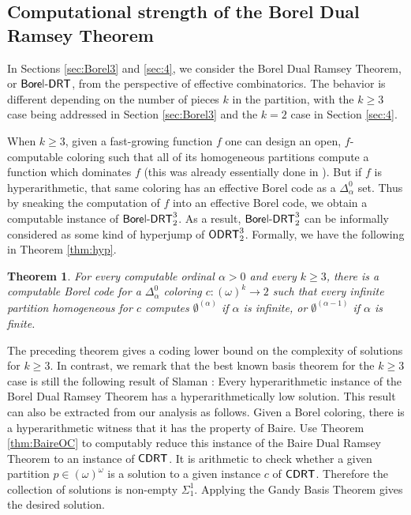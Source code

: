 \documentclass{amsart}
\newtheorem{thm}{Theorem}[section]
\theoremstyle{definition}
\theoremstyle{remark}
\newcommand{\system}[1]{\mbox{\fontfamily{cmss}\fontshape{n}\fontseries{m}%
    \selectfont#1}}
\newcommand{\BoDRT}{\system{Borel-DRT}}
\newcommand{\CDRT}{\system{CDRT}}
\newcommand{\ODRT}{\system{ODRT}}
\begin{document}
\subsection{Computational strength of the Borel Dual Ramsey Theorem}

In Sections \ref{sec:Borel3} and \ref{sec:4}, we consider the Borel Dual 
Ramsey Theorem, or $\BoDRT$, from the perspective of effective 
combinatorics.  The behavior is different depending on the number of 
pieces $k$ in the partition, with the $k\geq 3$ case being addressed in Section 
\ref{sec:Borel3} and the $k=2$ case in Section \ref{sec:4}.

When $k\geq 3$, given a fast-growing function $f$ one can design 
an open, $f$-computable 
coloring such that all of its homogeneous partitions compute 
a function which dominates $f$ (this was already essentially done 
in \cite{ms}).  But if $f$ is hyperarithmetic,
that same coloring has an effective Borel code as a $\Delta^0_\alpha$
set.  Thus by sneaking the computation of $f$ into an 
effective Borel code, we obtain a computable instance of 
$\BoDRT^3_2$.  As a result, $\BoDRT^3_2$ can be informally 
considered as some kind of hyperjump of $\ODRT^3_2$.  Formally,
we have the following in Theorem \ref{thm:hyp}.

\begin{thm}
For every computable ordinal $\alpha>0$ and every $k\geq 3$,
there is a computable Borel code for a $\Delta^0_\alpha$ coloring 
$c:(\omega)^k\rightarrow 2$ such that every infinite 
partition homogeneous for $c$ computes $\emptyset^{(\alpha)}$
if $\alpha$ is infinite, or $\emptyset^{(\alpha-1)}$ if $\alpha$ is finite.
\end{thm}

The preceding theorem gives a coding lower bound on the complexity 
of solutions for $k\geq 3$.  In contrast,
we remark that the best known basis theorem for the 
$k\geq 3$ case is still the following result of Slaman \cite{slaman}:
Every hyperarithmetic instance of the Borel Dual Ramsey Theorem
has a hyperarithmetically low solution. This result can also be 
extracted from our analysis as follows.  Given a Borel coloring,
there is a hyperarithmetic witness that it has the property of Baire.
Use Theorem \ref{thm:BaireOC} to computably reduce this instance
of the Baire Dual Ramsey Theorem to an instance of $\CDRT$.
It is arithmetic to check whether 
a given partition $p\in(\omega)^\omega$ 
is a solution to a given instance $c$ of $\CDRT$.  
Therefore the collection of solutions is non-empty $\Sigma^1_1$.
Applying the Gandy Basis Theorem gives the desired solution.
\end{document}
